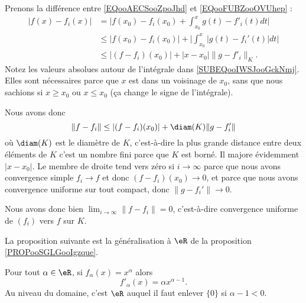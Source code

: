 \begin{normaltext}
\begin{subproof}
        Prenons la différence entre \eqref{EQooAECSooZpoJhd} et \eqref{EQooFUBZooOVUhep} :
        \begin{subequations}
            \begin{align}
                | f(x)-f_i(x) |&=\big| f(x_0)-f_i(x_0)+\int_{x_0}^x g(t)-f'_i(t)dt \big|\\
                &\leq | f(x_0)-f_i(x_0) |+\Big| \int_{x_0}^x| g(t)-f_i'(t) |dt  \Big|       \label{SUBEQooIWSJooGckNmj}\\
                &\leq | (f-f_i)(x_0) |+| x-x_0 |\| g-f'_i \|_K.
            \end{align}
        \end{subequations}
        Notez les valeurs absolues autour de l'intégrale dans \eqref{SUBEQooIWSJooGckNmj}. Elles sont nécessaires parce que \( x\) est dans un voisinage de \( x_0\), sans que nous sachions si \( x\geq x_0\) ou \( x\leq x_0\) (ça change le signe de l'intégrale).

        Nous avons donc
        \begin{equation}
            \| f-f_i \|\leq | (f-f_i)(x_0) |+\diam(K)\| g-f'_i \|
        \end{equation}
        où \( \diam(K)\) est le diamètre de \( K\), c'est-à-dire la plus grande distance entre deux éléments de \( K\) c'est un nombre fini parce que \( K\) est borné. Il majore évidemment \( | x-x_0 |\). Le membre de droite tend vers zéro si \( i\to \infty\) parce que nous avons convergence simple \( f_i\to f\) et donc \( (f-f_i)(x_0)\to 0\), et parce que nous avons convergence uniforme sur tout compact, donc \( \| g-f_i' \|\to 0\).

        Nous avons donc bien \( \lim_{i\to \infty}\| f-f_i \|=0\), c'est-à-dire convergence uniforme de \( (f_i)\) vers \( f\) sur \( K\).

        \end{subproof}
\end{normaltext}

La proposition suivante est la généralisation à \( \eR\) de la proposition \ref{PROPooSGLGooIgzque}.
\begin{proposition}     \label{PROPooKIASooGngEDh}
    Pour tout \( \alpha\in \eR\), si \( f_{\alpha}(x)=x^{\alpha}\) alors
    \begin{equation}
        f'_{\alpha}(x)=\alpha x^{\alpha-1}.
    \end{equation}
    Au niveau du domaine, c'est \( \eR\) auquel il faut enlever \( \{ 0 \}\) si \( \alpha-1<0\).
\end{proposition}

